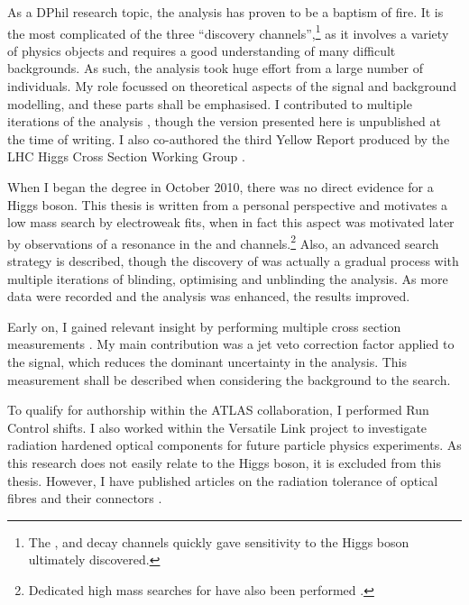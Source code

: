 
As a DPhil research topic, the \HWW analysis has proven to be a baptism of fire. It is the 
most complicated of the three ``discovery channels'',\footnote{
	The \HepProcess{\Pphoton\Pphoton}, \ZZ and \WW decay channels quickly gave sensitivity 
	to the Higgs boson ultimately discovered.
}
as it involves a variety of physics objects and requires a good understanding of many 
difficult backgrounds. As such, the analysis took huge effort from a large number of 
individuals. My role focussed on theoretical aspects of the signal and background 
modelling, and these parts shall be emphasised. I contributed to multiple iterations of 
the analysis \cite{HWW-Moriond:2012,HWW-MVA,HWW-7TeV,ATLAS-discovery,HWW-discovery-contribution,HWW-HCP,HWW-Moriond}, 
though the version presented here is unpublished at the time of writing. I also 
co-authored the third Yellow Report produced by the LHC Higgs Cross Section Working Group 
\cite{YR3}.

When I began the degree in October 2010, there was no direct evidence for a Higgs boson. 
This thesis is written from a personal perspective and motivates a low mass search by 
electroweak fits, when in fact this aspect was motivated later by observations of a 
resonance in the \HepProcess{\Pphoton\Pphoton} and \ZZ channels.\footnote{
	Dedicated high mass searches for \HWW have also been performed \cite{HWW-highmass}.
}
Also, an advanced search strategy is described, though the discovery of \HWW was actually 
a gradual process with multiple iterations of blinding, optimising and unblinding the 
analysis. As more data were recorded and the analysis was enhanced, the results improved.

Early on, I gained relevant insight by performing multiple \WW cross section measurements 
\cite{WW-35ipb,WW-EPS,WW-1ifb,WW-HCP,WW-7TeV}. My main contribution was a jet veto 
correction factor applied to the \WW signal, which reduces the dominant uncertainty in the 
analysis. This measurement shall be described when considering the \WW background to the 
\HWW search.

To qualify for authorship within the ATLAS collaboration, I performed Run Control shifts. 
I also worked within the Versatile Link project \cite{VersatileLink} to investigate 
radiation hardened optical components for future particle physics experiments. As this 
research does not easily relate to the Higgs boson, it is excluded from this thesis. 
However, I have published articles on the radiation tolerance of optical fibres 
\cite{VersatileLinkFibres} and their connectors \cite{VersatileLinkConnectors}.

